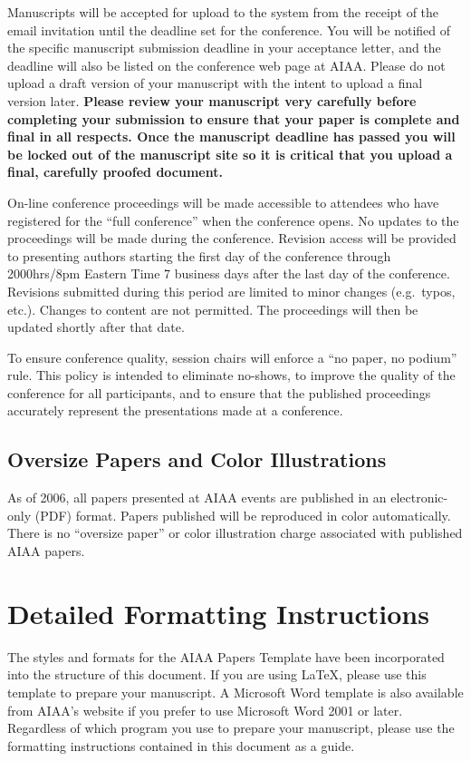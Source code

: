 \documentclass[conf]{new-aiaa}
\begin{document}
Manuscripts will be accepted for upload to the system from the receipt of the email invitation until the deadline set for the conference. You will be notified of the specific manuscript submission deadline in your acceptance letter, and the deadline will also be listed on the conference web page at AIAA. Please do not upload a draft version of your manuscript with the intent to upload a final version later. \textbf{Please review your manuscript very carefully before completing your submission to ensure that your paper is complete and final in all respects. Once the manuscript deadline has passed you will be locked out of the manuscript site so it is critical that you upload a final, carefully proofed document.}

On-line conference proceedings will be made accessible to attendees who have registered for the ``full conference'' when the conference opens. No updates to the proceedings will be made during the conference. Revision access will be provided to presenting authors starting the first day of the conference through 2000hrs/8pm Eastern Time 7 business days after the last day of the conference. Revisions submitted during this period are limited to minor changes (e.g.~typos, etc.). Changes to content are not permitted. The proceedings will then be updated shortly after that date.

To ensure conference quality, session chairs will enforce a ``no paper, no podium'' rule. This policy is intended to eliminate no-shows, to improve the quality of the conference for all participants, and to ensure that the published proceedings accurately represent the presentations made at a conference.

\subsection{Oversize Papers and Color Illustrations}
As of 2006, all papers presented at AIAA events are published in an electronic-only (PDF) format. Papers published will be reproduced in color automatically. There is no ``oversize paper'' or color illustration charge associated with published AIAA papers.

\section{Detailed Formatting Instructions}

The styles and formats for the AIAA Papers Template have been incorporated into the structure of this document. If you are using \LaTeX{}, please use this template to prepare your manuscript. A Microsoft Word template is also available from AIAA's website if you prefer to use Microsoft Word 2001 or later. Regardless of which program you use to prepare your manuscript, please use the formatting instructions contained in this document as a guide.
\end{document}
